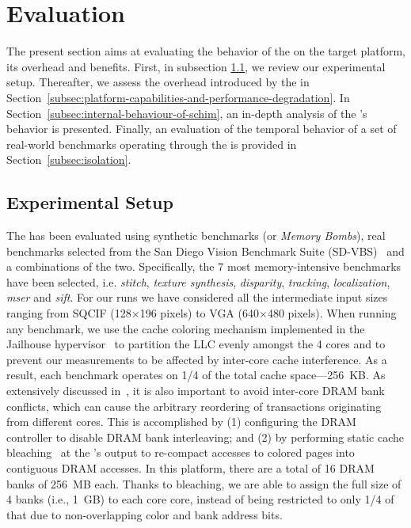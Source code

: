 \section{Evaluation}

The present section aims at evaluating the behavior of the \schim on
the target platform, its overhead and benefits.  First, in subsection
\ref{subsection:considered-architecture}, we review our experimental
setup. Thereafter, we assess the overhead introduced by the \schim in
Section~\ref{subsec:platform-capabilities-and-performance-degradation}. In
Section~\ref{subsec:internal-behaviour-of-schim}, an in-depth analysis
of the \schim's behavior is presented. Finally, an evaluation of the
temporal behavior of a set of real-world benchmarks operating through
the \schim is provided in Section~\ref{subsec:isolation}.


\subsection{Experimental Setup}
\label{subsection:considered-architecture}
The \schim has been evaluated using synthetic benchmarks (or
\emph{Memory Bombs}), real benchmarks selected from the San Diego
Vision Benchmark Suite (SD-VBS)~\cite{SD-VBS} and a combinations of
the two. Specifically, the 7 most memory-intensive benchmarks have
been selected, i.e. \emph{stitch}, \emph{texture synthesis},
\emph{disparity}, \emph{tracking}, \emph{localization}, \emph{mser}
and \emph{sift}. For our runs we have considered all the intermediate
input sizes ranging from SQCIF (128$\times$196 pixels) to VGA
(640$\times$480 pixels). When running any benchmark, we use the cache
coloring mechanism implemented in the Jailhouse
hypervisor~\cite{determ_virt} to partition the LLC evenly amongst the
4 cores and to prevent our measurements to be affected by inter-core
cache interference. As a result, each benchmark operates on 1/4 of the
total cache space---256~KB. As extensively discussed
in~\cite{bounding_rtas14, palloc_rtas14}, it is also important to
avoid inter-core DRAM bank conflicts, which can cause the arbitrary
reordering of transactions originating from different cores. This is
accomplished by (1) configuring the DRAM controller to disable DRAM
bank interleaving; and (2) by performing static cache
bleaching~\cite{gracioli2019designing, PLIM20} at the \schim's output
to re-compact accesses to colored pages into contiguous DRAM
accesses. In this platform, there are a total of 16 DRAM banks of
256~MB each. Thanks to bleaching, we are able to assign the full size
of 4 banks (i.e., 1~GB) to each core core, instead of being restricted
to only 1/4 of that due to non-overlapping color and bank address
bits.

